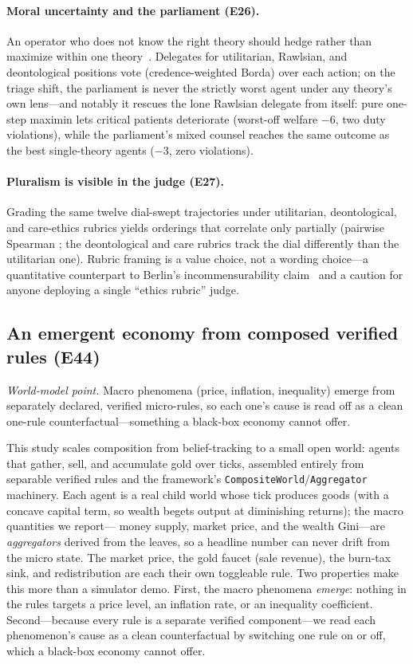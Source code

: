 \documentclass[11pt]{article}
\begin{document}
\paragraph{Moral uncertainty and the parliament (E26).} An operator who
does not know the right theory should hedge rather than maximize within one
theory~\cite{macaskill2020}. Delegates for utilitarian, Rawlsian, and
deontological positions vote (credence-weighted Borda) over each action; on
the triage shift, the parliament is never the strictly worst agent under
any theory's own lens---and notably it rescues the lone Rawlsian
delegate from itself: pure one-step maximin lets critical patients
deteriorate (worst-off welfare $-6$, two duty violations), while the
parliament's mixed counsel reaches the same outcome as the best
single-theory agents ($-3$, zero violations).

\paragraph{Pluralism is visible in the judge (E27).} Grading the same
twelve dial-swept trajectories under utilitarian, deontological, and
care-ethics rubrics yields orderings that correlate only partially
(pairwise Spearman \RubricPluralismRange; the deontological and care
rubrics track the dial differently than the utilitarian one). Rubric
framing is a value choice, not a wording choice---a quantitative
counterpart to Berlin's incommensurability claim~\cite{berlin1969} and a
caution for anyone deploying a single ``ethics rubric'' judge.

\subsection{An emergent economy from composed verified rules (E44)}\label{sec:economy}

\emph{World-model point.} Macro phenomena (price, inflation, inequality) emerge from separately
declared, verified micro-rules, so each one's cause is read off as a clean one-rule
counterfactual---something a black-box economy cannot offer.

This study scales composition from belief-tracking to a small open
world: \EconAgents{} agents that gather, sell, and accumulate gold over
\EconTicks{} ticks, assembled entirely from separable verified rules and the
framework's \texttt{CompositeWorld}/\texttt{Aggregator} machinery. Each agent is
a real child world whose tick produces goods (with a concave capital term, so
wealth begets output at diminishing returns); the macro quantities we report---
money supply, market price, and the wealth Gini---are \emph{aggregators} derived
from the leaves, so a headline number can never drift from the micro state. The
market price, the gold faucet (sale revenue), the burn-tax sink, and
redistribution are each their own toggleable rule. Two properties make this more
than a simulator demo. First, the macro phenomena \emph{emerge}: nothing in the
rules targets a price level, an inflation rate, or an inequality coefficient.
Second---because every rule is a separate verified component---we read each
phenomenon's cause as a clean counterfactual by switching one rule on or off,
which a black-box economy cannot offer.
\end{document}
